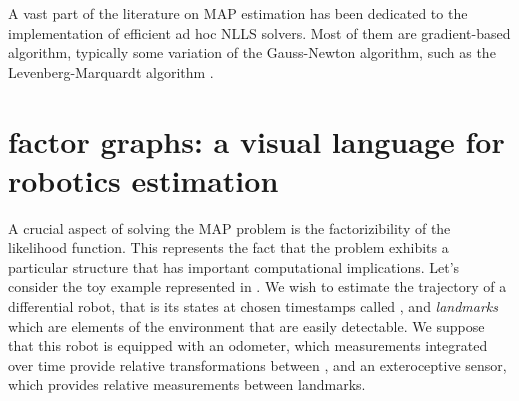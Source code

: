 A vast part of the literature on MAP estimation has been dedicated to the implementation of efficient ad hoc NLLS solvers. Most of them are 
gradient-based algorithm, typically some variation of the Gauss-Newton algorithm, such as the Levenberg-Marquardt algorithm \cite{boyd2004convex}.


\section{factor graphs: a visual language for robotics estimation}
A crucial aspect of solving the MAP problem is the factorizibility of the likelihood function. This represents the fact that the problem
exhibits a particular structure that has important computational implications. Let's consider the toy example represented in . 
We wish to estimate the trajectory of a differential robot, that is its states at chosen timestamps called \textit{\keyframes}, and \textit{landmarks} which are elements of the 
environment that are easily detectable. We suppose that this robot is equipped with an odometer, which measurements integrated over time provide relative 
transformations between \keyframes, and an exteroceptive sensor, which provides relative measurements between \keyframes landmarks.

